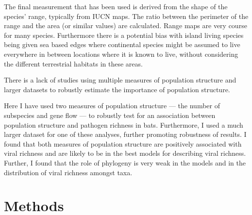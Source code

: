 
The final measurement that has been used is derived from the shape of the species' range, typically from IUCN \cite{iucn} maps.
The ratio between the perimeter of the range and the area (or similar values) are calculated.
Range maps are very course for many species.
Furthermore there is a potential bias with island living species being given sea based edges where continental species might be assumed to live everywhere in between locations where it is known to live, without considering the different terrestrial habitats in these areas.


There is a lack of studies using multiple measures of population structure and larger datasets to robustly estimate the importance of population structure.



Here I have used two measures of population structure --- the number of subspecies and gene flow --- to robustly test for an association between population structure and pathogen richness in bats.
Furthermore, I used a much larger dataset for one of these analyses, further promoting robustness of results.
I found that both measures of population structure are positively associated with viral richness and are likely to be in the best models for describing viral richness.
Further, I found that the role of phylogeny is very weak in the models and in the distribution of viral richness amongst taxa.



\section{Methods}

